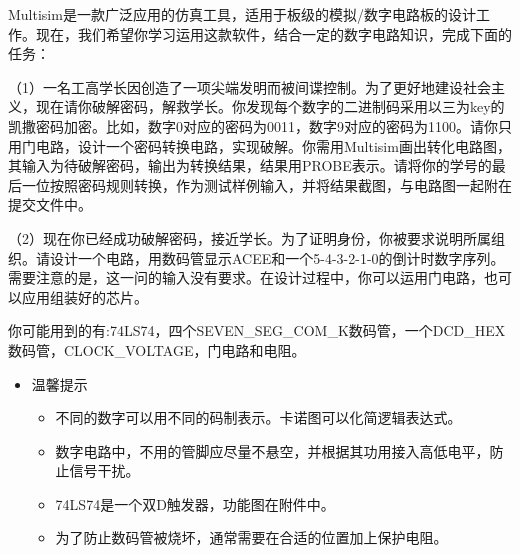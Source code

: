 \documentclass[12pt,a4paper]{article}
\begin{document}
\begin{ACEEproblem}{1.4}{\xiaosihao}{\youyuan}
Multisim是一款广泛应用的仿真工具，适用于板级的模拟/数字电路板的设计工作。现在，我们希望你学习运用这款软件，结合一定的数字电路知识，完成下面的任务：\par
（1）一名工高学长因创造了一项尖端发明而被间谍控制。为了更好地建设社会主义，现在请你破解密码，解救学长。你发现每个数字的二进制码采用以三为key的凯撒密码加密。比如，数字0对应的密码为0011，数字9对应的密码为1100。请你只用门电路，设计一个密码转换电路，实现破解。你需用Multisim画出转化电路图，其输入为待破解密码，输出为转换结果，结果用PROBE表示。请将你的学号的最后一位按照密码规则转换，作为测试样例输入，并将结果截图，与电路图一起附在提交文件中。\par

（2）现在你已经成功破解密码，接近学长。为了证明身份，你被要求说明所属组织。请设计一个电路，用数码管显示ACEE和一个5-4-3-2-1-0的倒计时数字序列。需要注意的是，这一问的输入没有要求。在设计过程中，你可以运用门电路，也可以应用组装好的芯片。\par
你可能用到的有:74LS74，四个SEVEN\_SEG\_COM\_K数码管，一个DCD\_HEX数码管，CLOCK\_VOLTAGE，门电路和电阻。\par



\begin{itemize}
	\item 温馨提示
	\begin{itemize}
		\item[1.] 不同的数字可以用不同的码制表示。卡诺图可以化简逻辑表达式。
		\item[2.] 数字电路中，不用的管脚应尽量不悬空，并根据其功用接入高低电平，防止信号干扰。
		\item[3.] 74LS74是一个双D触发器，功能图在附件中。
		\item[4.] 为了防止数码管被烧坏，通常需要在合适的位置加上保护电阻。
	\end{itemize}
\end{itemize}
\end{ACEEproblem}
\end{document}
